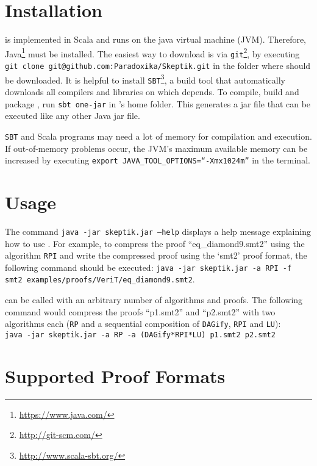 \documentclass{llncs}
\begin{document}
\newcommand{\com}[1]{\texttt{#1}}

\section{Installation}

{\skeptik} is implemented in Scala and runs on the java virtual machine (JVM). Therefore, Java\footnote{\url{https://www.java.com/}} must be installed. The easiest way to download {\skeptik} is via \texttt{git}\footnote{\url{http://git-scm.com/}}, by executing \com{git clone git@github.com:Paradoxika/Skeptik.git} in the folder where {\skeptik} should be downloaded. It is helpful to install \texttt{SBT}\footnote{\url{http://www.scala-sbt.org/}}, a build tool that automatically downloads all compilers and libraries on which {\skeptik} depends. To compile, build and package {\skeptik}, run \com{sbt one-jar} in {\skeptik}'s home folder. This generates a jar file that can be executed like any other Java jar file.

\texttt{SBT} and Scala programs may need a lot of memory for compilation and execution. If out-of-memory problems occur, the JVM's maximum available memory can be increased by executing \com{export JAVA\_TOOL\_OPTIONS=``-Xmx1024m''} in the terminal.


\section{Usage}

The command \com{java -jar skeptik.jar --help} displays a help message explaining how to use {\skeptik}. For example, to compress the proof ``eq\_diamond9.smt2'' using the algorithm \texttt{RPI} and write the compressed proof using the `smt2' proof format, the following command should be executed: \com{java -jar skeptik.jar -a RPI -f smt2 examples/proofs/VeriT/eq\_diamond9.smt2}.

{\skeptik} can be called with an arbitrary number of algorithms and proofs. The following command would compress the proofs ``p1.smt2'' and ``p2.smt2'' with two algorithms each (\texttt{RP} and a sequential composition of \texttt{DAGify}, \texttt{RPI} and \texttt{LU}): \\
\com{java -jar skeptik.jar -a RP -a (DAGify*RPI*LU) p1.smt2 p2.smt2} 

\section{Supported Proof Formats}
\label{sec:ProofFormats}
\end{document}
